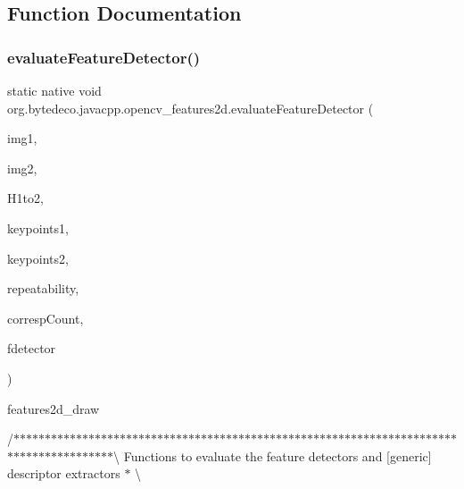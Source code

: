 \subsection{Function Documentation}
\mbox{\label{group__features2d_gaae7a705a66cbdd0ed99122fe183a0e03}} 
\subsubsection{\texorpdfstring{evaluate\+Feature\+Detector()}{evaluateFeatureDetector()}}
{\footnotesize\ttfamily static native void org.\+bytedeco.\+javacpp.\+opencv\+\_\+features2d.\+evaluate\+Feature\+Detector (\begin{DoxyParamCaption}\item[{@Const @By\+Ref Mat}]{img1,  }\item[{@Const @By\+Ref Mat}]{img2,  }\item[{@Const @By\+Ref Mat}]{H1to2,  }\item[{Key\+fr.antproject.utils.Point\+Vector}]{keypoints1,  }\item[{Key\+fr.antproject.utils.Point\+Vector}]{keypoints2,  }\item[{@By\+Ref Float\+Pointer}]{repeatability,  }\item[{@By\+Ref Int\+Pointer}]{corresp\+Count,  }\item[{@Cast(\char`\"{}cv\+::\+Feature\+Detector$\ast$\char`\"{}) @Ptr Feature2D}]{fdetector }\end{DoxyParamCaption})\hspace{0.3cm}{\ttfamily [static]}}

features2d\+\_\+draw 

/$\ast$$\ast$$\ast$$\ast$$\ast$$\ast$$\ast$$\ast$$\ast$$\ast$$\ast$$\ast$$\ast$$\ast$$\ast$$\ast$$\ast$$\ast$$\ast$$\ast$$\ast$$\ast$$\ast$$\ast$$\ast$$\ast$$\ast$$\ast$$\ast$$\ast$$\ast$$\ast$$\ast$$\ast$$\ast$$\ast$$\ast$$\ast$$\ast$$\ast$$\ast$$\ast$$\ast$$\ast$$\ast$$\ast$$\ast$$\ast$$\ast$$\ast$$\ast$$\ast$$\ast$$\ast$$\ast$$\ast$$\ast$$\ast$$\ast$$\ast$$\ast$$\ast$$\ast$$\ast$$\ast$$\ast$$\ast$$\ast$$\ast$$\ast$$\ast$$\ast$$\ast$$\ast$$\ast$$\ast$$\ast$$\ast$$\ast$$\ast$$\ast$$\ast$$\ast$$\ast$$\ast$$\ast$$\ast$$\ast$\textbackslash{} Functions to evaluate the feature detectors and \mbox{[}generic\mbox{]} descriptor extractors $\ast$ \textbackslash{} 